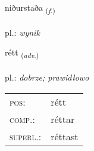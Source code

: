 \documentclass[frontgrid, backgrid]{flacards}\usepackage[]{graphicx}\usepackage[]{xcolor}
\begin{document}
\renewcommand{\flhead}{\vskip5pt \fboxsep=0pt {\small\bfseries\footnotesize Nafnorð | Noun}}
\renewcommand{\fcfoot}{\vskip5pt \fboxsep=0pt \hspace{2pt}{\small\bfseries\footnotesize 1K}}

\renewcommand{\blhead}{\vskip5pt {\small\bfseries\footnotesize Nafnorð | Noun }}
\renewcommand{\bcfoot}{\vskip5pt \hspace{2pt}{\small\bfseries\footnotesize 1K}}


{niðurstaða \small{\textsubscript{(\textit{f.})}} \\[1ex] %
 \\
pl.: \emph{wynik} \\  [2ex]
\renewcommand*{\arraystretch}{0.8}
}

\renewcommand{\flhead}{\vskip5pt \fboxsep=0pt {\small\bfseries\footnotesize Atviksorð | Adverb}}
\renewcommand{\fcfoot}{\vskip5pt \fboxsep=0pt \hspace{2pt}{\small\bfseries\footnotesize 1K}}

\renewcommand{\blhead}{\vskip5pt {\small\bfseries\footnotesize Atviksorð | Adverb }}
\renewcommand{\bcfoot}{\vskip5pt \hspace{2pt}{\small\bfseries\footnotesize 1K}}


{rétt \small{\textsubscript{(\textit{adv.})}} \\[1ex] %
\textphonetic{[rjɛht]} \\
pl.: \emph{dobrze; prawidłowo} \\  [2ex]
\renewcommand*{\arraystretch}{0.8}
\begin{tabular}{ll}
\textsc{pos}: & rétt \\ 
\textsc{comp.}: & réttar \\ 
\textsc{superl.}: & réttast \\
\end{tabular}
}
\end{document}
